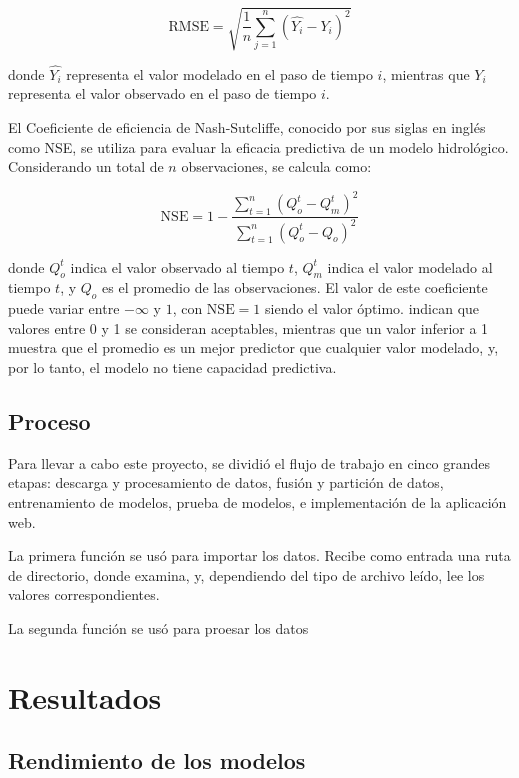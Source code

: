 \documentclass[hess, manuscript]{copernicus}
\begin{document}
\begin{equation}
  \mathrm{RMSE} = \sqrt{\dfrac{1}{n}\sum_{j=1}^{n} (\hat{Y_i}-Y_i)^2}
\end{equation}

donde $\hat{Y_i}$ representa el valor modelado en el paso de tiempo $i$, mientras que $Y_i$ representa el valor observado en el paso de tiempo $i$.

El Coeficiente de eficiencia de Nash-Sutcliffe, conocido por sus siglas en inglés como NSE, se utiliza para evaluar la eficacia predictiva de un modelo hidrológico. Considerando un total de $n$ observaciones, se calcula como:

\begin{equation}
  \mathrm{NSE} = 1 - \dfrac
  {\sum_{t=1}^n (Q_o^t-Q_m^t)^2}
  {\sum_{t=1}^n (Q_o^t-Q_o)^2}
\end{equation}

donde $Q_o^t$ indica el valor observado al tiempo $t$, $Q_m^t$ indica el valor modelado al tiempo $t$, y $Q_o$ es el promedio de las observaciones. El valor de este coeficiente puede variar entre $-\infty$ y $1$, con $\mathrm{NSE}=1$ siendo el valor óptimo. \citet{melsen_rise_2025} indican que valores entre 0 y 1 se consideran aceptables, mientras que un valor inferior a 1 muestra que el promedio es un mejor predictor que cualquier valor modelado, y, por lo tanto, el modelo no tiene capacidad predictiva.

\subsection{Proceso}
Para llevar a cabo este proyecto, se dividió el flujo de trabajo en cinco grandes etapas: descarga y procesamiento de datos, fusión y partición de datos, entrenamiento de modelos, prueba de modelos, e implementación de la aplicación web.

La primera función se usó para importar los datos. Recibe como entrada una ruta de directorio, donde examina, y, dependiendo del tipo de archivo leído, lee los valores correspondientes.

La segunda función se usó para proesar los datos
\section{Resultados}
\label{sec:Resultados}

\subsection{Rendimiento de los modelos}
\end{document}
